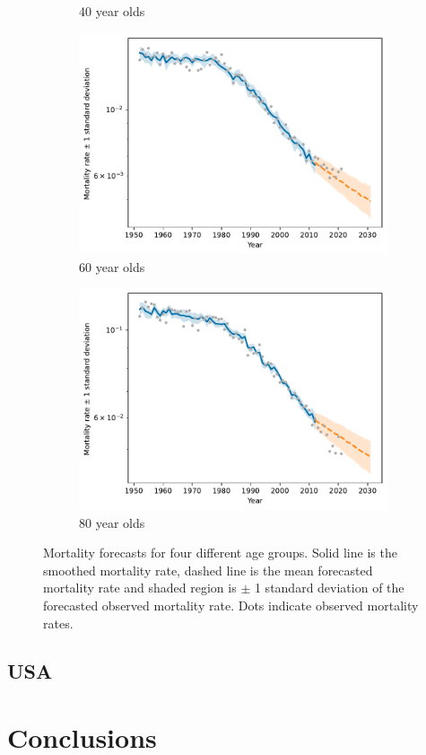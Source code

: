 \documentclass[preprint,12pt]{elsarticle}
\begin{document}
\begin{figure}
\begin{subfigure}[b]{0.45\textwidth}
        \caption{40 year olds}
    \end{subfigure}
    \hfill
    \begin{subfigure}[b]{0.45\textwidth}
        \centering
        \includegraphics[width=\textwidth]{figs/sweden_1952_2011_Male_100_1_3rateVsTimeAge60.pdf}
        \caption{60 year olds}
    \end{subfigure}
    \hfill
    \begin{subfigure}[b]{0.45\textwidth}
        \centering
        \includegraphics[width=\textwidth]{figs/sweden_1952_2011_Male_100_1_3rateVsTimeAge80.pdf}
        \caption{80 year olds}
    \end{subfigure}
       \caption{Mortality forecasts for four different age groups. Solid line is the smoothed mortality rate, dashed line is the mean forecasted mortality rate and shaded region is $\pm$ 1 standard deviation of the forecasted observed mortality rate. Dots indicate observed mortality rates.}
       \label{fig:model_forecast_sweden}
\end{figure}

\subsection{USA}



\section{Conclusions}\label{sec:conclusions}


\end{document}
